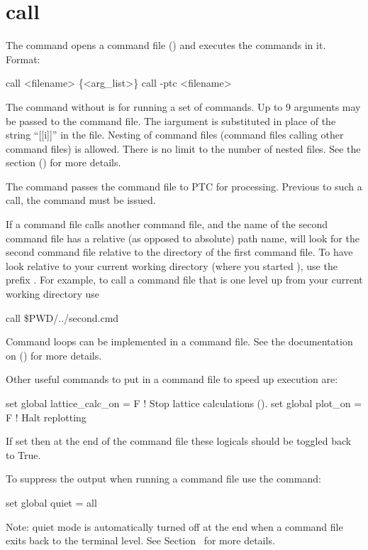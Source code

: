 \section{call}
\label{s:call}

The  command opens a command file () and executes the
commands in it. Format:
\vskip 1pt 
\begin{example}
  call <filename> \{<arg_list>\}
  call -ptc <filename>
\end{example}

\vskip 1pt 
The  command without  is for running a set of \tao commands.  Up to 9
arguments may be passed to the command file. The i\Th argument is substituted in place of
the string ``[[i]]'' in the file. Nesting of command files (command files calling other
command files) is allowed. There is no limit to the number of nested files.  See the
 section () for more details.

The  command passes the command file to PTC for processing. Previous to such
a call, the command  must be issued.

If a command file calls another command file, and the name of the second command file has a relative
(as opposed to absolute) path name, \tao will look for the second command file relative to the
directory of the first command file. To have \tao look relative to your current working directory
(where you started \tao), use the prefix . For example, to call a command file that is
one level up from your current working directory use
\begin{example}
  call \$PWD/../second.cmd
\end{example}

Command loops can be implemented in a command file. See the documentation on 
() for more details.

Other useful commands to put in a command file to speed up execution are:
\begin{example}
  set global lattice_calc_on = F   ! Stop lattice calculations ().
  set global plot_on = F           ! Halt replotting
\end{example}
If set then at the end of the command file these logicals should be toggled back to True.

To suppress the output when running a command file use the command:
\begin{example}
  set global quiet = all
\end{example}
Note: quiet mode is automatically turned off at the end when a command file exits back to the
terminal level. See Section~ for more details.

